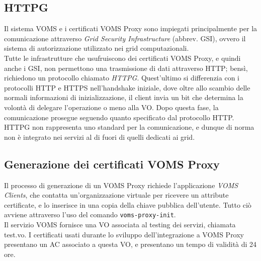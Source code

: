 \subsection{HTTPG}
Il sistema VOMS e i certificati VOMS Proxy sono impiegati principalmente per la comunicazione attraverso \textit{Grid Security Infrastructure} (abbrev. GSI), ovvero 
il sistema di autorizzazione utilizzato nei grid computazionali. 
\\Tutte le infrastrutture che usufruiscono dei certificati VOMS Proxy, e quindi anche i GSI, non permettono una trasmissione di dati attraverso HTTP; bensì, richiedono un protocollo chiamato \textit{HTTPG}.
Quest'ultimo si differenzia con i protocolli HTTP e HTTPS nell'handshake iniziale, dove oltre allo scambio delle normali informazioni di inizializzazione, il client invia un bit che determina la volontà di delegare l'operazione o meno alla VO.
Dopo questa fase, la comunicazione prosegue seguendo quanto specificato dal protocollo HTTP.    
\\ HTTPG non rappresenta uno standard per la comunicazione, e dunque di norma non è integrato nei servizi al di fuori di quelli dedicati ai grid.  

\subsection{Generazione dei certificati VOMS Proxy}
Il processo di generazione di un VOMS Proxy richiede l'applicazione \textit{VOMS Clients}, che contatta un'organizzazione virtuale per ricevere un attribute 
certificate, e lo inserisce in una copia della chiave pubblica dell'utente. Tutto ciò avviene attraverso l'uso del comando \texttt{voms-proxy-init}. 
\\Il servizio VOMS fornisce una VO associata al testing dei servizi, chiamata test.vo. I certificati usati durante lo sviluppo 
dell'integrazione a VOMS Proxy presentano un AC associato a questa VO, e presentano un tempo di validità di 24 ore.   

